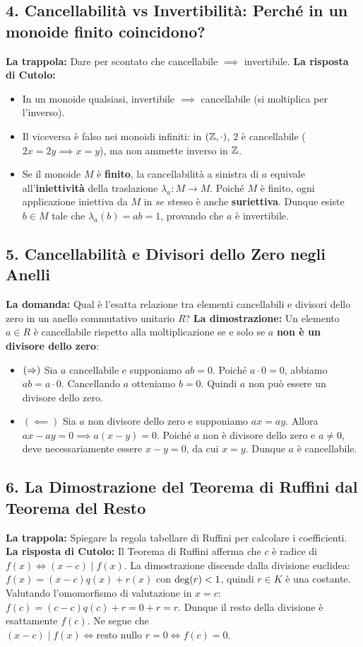 \subsection{4. Cancellabilità vs Invertibilità: Perché in un monoide finito coincidono?}
\textbf{La trappola:} Dare per scontato che cancellabile $\implies$ invertibile.
\textbf{La risposta di Cutolo:}
\begin{itemize}
    \item In un monoide qualsiasi, invertibile $\implies$ cancellabile (si moltiplica per l'inverso).
    \item Il viceversa è falso nei monoidi infiniti: in $(\mathbb{Z}, \cdot)$, $2$ è cancellabile ($2x = 2y \implies x = y$), ma non ammette inverso in $\mathbb{Z}$.
    \item Se il monoide $M$ è \textbf{finito}, la cancellabilità a sinistra di $a$ equivale all'\textbf{iniettività} della traslazione $\lambda_a: M \to M$. Poiché $M$ è finito, ogni applicazione iniettiva da $M$ in $se$ stesso è anche \textbf{suriettiva}. Dunque esiste $b \in M$ tale che $\lambda_a(b) = ab = 1$, provando che $a$ è invertibile.
\end{itemize}

\subsection{5. Cancellabilità e Divisori dello Zero negli Anelli}
\textbf{La domanda:} Qual è l'esatta relazione tra elementi cancellabili e divisori dello zero in un anello commutativo unitario $R$?
\textbf{La dimostrazione:}
Un elemento $a \in R$ è cancellabile rispetto alla moltiplicazione se e solo se $a$ \textbf{non è un divisore dello zero}:
\begin{itemize}
    \item $(\Rightarrow)$ Sia $a$ cancellabile e supponiamo $ab = 0$. Poiché $a \cdot 0 = 0$, abbiamo $ab = a \cdot 0$. Cancellando $a$ otteniamo $b = 0$. Quindi $a$ non può essere un divisore dello zero.
    \item $(\impliedby)$ Sia $a$ non divisore dello zero e supponiamo $ax = ay$. Allora $ax - ay = 0 \implies a(x - y) = 0$. Poiché $a$ non è divisore dello zero e $a \neq 0$, deve necessariamente essere $x - y = 0$, da cui $x = y$. Dunque $a$ è cancellabile.
\end{itemize}

\subsection{6. La Dimostrazione del Teorema di Ruffini dal Teorema del Resto}
\textbf{La trappola:} Spiegare la regola tabellare di Ruffini per calcolare i coefficienti.
\textbf{La risposta di Cutolo:} Il Teorema di Ruffini afferma che $c$ è radice di $f(x) \iff (x - c) \mid f(x)$.
La dimostrazione discende dalla divisione euclidea: $f(x) = (x - c)q(x) + r(x)$ con $\operatorname{deg}(r) < 1$, quindi $r \in K$ è una costante.
Valutando l'omomorfismo di valutazione in $x = c$: $f(c) = (c - c)q(c) + r = 0 + r = r$.
Dunque il resto della divisione è esattamente $f(c)$. Ne segue che $(x - c) \mid f(x) \iff \text{resto nullo } r = 0 \iff f(c) = 0$.

